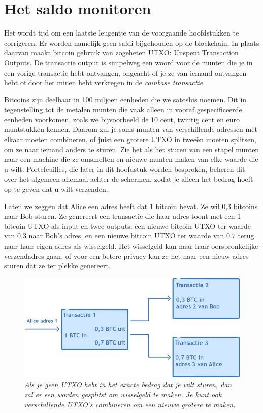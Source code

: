 \section{Het saldo monitoren}

Het wordt tijd om een laatste leugentje van de voorgaande hoofdstukken te corrigeren. Er worden namelijk geen saldi bijgehouden op de blockchain. In plaats daarvan maakt bitcoin gebruik van zogeheten UTXO: Unspent Transaction Outputs. De transactie output is simpelweg een woord voor de munten die je in een vorige transactie hebt ontvangen, ongeacht of je ze van iemand ontvangen hebt of door het minen hebt verkregen in de \textit{coinbase transactie}.

Bitcoins zijn deelbaar in 100 miljoen eenheden die we satoshis noemen. Dit in tegenstelling tot de metalen munten die vaak alleen in vooraf gespecificeerde eenheden voorkomen, zoals we bijvoorbeeld de 10 cent, twintig cent en euro muntstukken kennen. Daarom zul je soms munten van verschillende adressen met elkaar moeten combineren, of juist een grotere UTXO in tweeën moeten splitsen, om ze naar iemand anders te sturen. Zie het als het sturen van een stapel munten naar een machine die ze omsmelten en nieuwe munten maken van elke waarde die u wilt. Portefeuilles, die later in dit hoofdstuk worden besproken, beheren dit over het algemeen allemaal achter de schermen, zodat je alleen het bedrag hoeft op te geven dat u wilt verzenden.

Laten we zeggen dat Alice een adres heeft dat 1 bitcoin bevat. Ze wil 0,3 bitcoins naar Bob sturen. Ze genereert een transactie die haar adres toont met een 1 bitcoin UTXO als input en twee outputs: een nieuwe bitcoin UTXO ter waarde van 0.3 naar Bob's adres, en een nieuwe bitcoin UTXO ter waarde van 0.7 terug naar haar eigen adres als wisselgeld. Het wisselgeld kan naar haar oorspronkelijke verzendadres gaan, of voor een betere privacy kan ze het naar een nieuw adres sturen dat ze ter plekke genereert.

\begin{figure}[h]
    \centering
    \includegraphics[width=\textwidth]{images/fig14.png}
    \caption{\footnotesize{\textit{Als je geen UTXO hebt in het exacte bedrag dat je wilt sturen, dan zal er een worden gesplitst om wisselgeld te maken. Je kunt ook verschillende UTXO's combineren om een nieuwe grotere te maken.}}}
    \label{fig14}
\end{figure}

